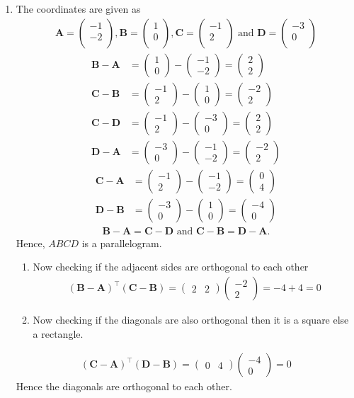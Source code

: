 \documentclass[12pt]{article}
\newcommand{\myvec}[1]{\ensuremath{\begin{pmatrix}#1\end{pmatrix}}}
\let\vec\mathbf
\begin{document}
\begin{enumerate}
\item The coordinates are given as
	\begin{align}
	\vec{A} = \myvec{
		-1\\
		-2\\
		},
	\vec{B} = \myvec{
		1\\
		0\\
		},
	\vec{C} = \myvec{
		-1\\
		2\\
		} \text{ and }
	\vec{D} = \myvec{
		-3\\
		0\\
		}
	\end{align}
	\begin{align}
		\vec{B} - \vec{A} &= \myvec{1\\0} - \myvec{-1\\-2} = \myvec{2\\2}\\
		\vec{C} - \vec{B} &= \myvec{-1\\2} - \myvec{1\\0} = \myvec{-2\\2}\\
		\vec{C} - \vec{D} &= \myvec{-1\\2} - \myvec{-3\\0} = \myvec{2\\2}\\
		\vec{D} - \vec{A} &= \myvec{-3\\0} - \myvec{-1\\-2} = \myvec{-2\\2}
	\end{align}
	\begin{align}	
		\vec{C} - \vec{A} &= \myvec{-1\\2} - \myvec{-1\\-2} = \myvec{0\\4}\\
		\vec{D} - \vec{B} &= \myvec{-3\\0} - \myvec{1\\0} = \myvec{-4\\0}
	\end{align}
	\begin{align}	
		\vec{B}-\vec{A} = \vec{C}-\vec{D} \text{ and } \vec{C}-\vec{B} = \vec{D}-\vec{A}.
	\end{align}
	Hence, $ABCD$ is a parallelogram.
	\begin{enumerate}
		\item Now checking if the adjacent sides are orthogonal to each other
	\begin{align}
		(\vec{B}-\vec{A})^\top (\vec{C}-\vec{B}) = \myvec{2&2} \myvec{-2\\2} = -4+4 = 0
	\end{align}
		\item Now checking if the diagonals are also orthogonal then it is a square else a rectangle.
	\end{enumerate}	
	\begin{align}
		(\vec{C}-\vec{A})^\top (\vec{D}-\vec{B}) = \myvec{0&4} \myvec{-4\\0} = 0
	\end{align}
	Hence the diagonals are orthogonal to each other.


\end{enumerate}
\end{document}
